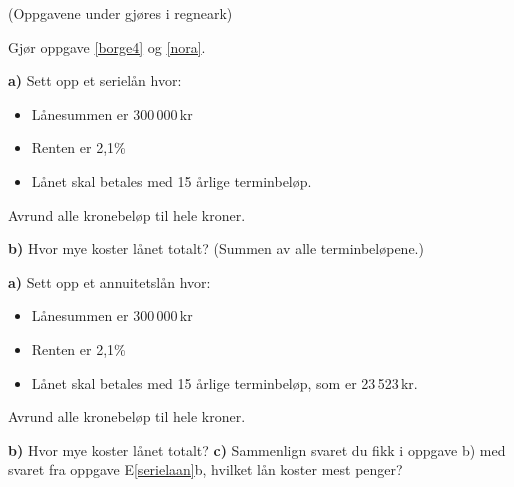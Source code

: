 



{} 

\opgt

(Oppgavene under gjøres i regneark) \vsk

Gjør oppgave \ref{borge4} og \ref{nora}.

\textbf{a)} Sett opp et serielån hvor:
\begin{itemize}
	\item Lånesummen er 300\,000\,kr
	\item Renten er 2,1\%
	\item Lånet skal betales med 15 årlige terminbeløp.
\end{itemize}
Avrund alle kronebeløp til hele kroner.\os

\textbf{b)} Hvor mye koster lånet totalt? (Summen av alle terminbeløpene.)

\textbf{a)} Sett opp et annuitetslån hvor:
\begin{itemize}
	\item Lånesummen er 300\,000\,kr
	\item Renten er 2,1\%
	\item Lånet skal betales med 15 årlige terminbeløp, som er 23\,523\,kr.
\end{itemize}
Avrund alle kronebeløp til hele kroner.\os

\textbf{b)} Hvor mye koster lånet totalt? \os
\textbf{c)} Sammenlign svaret du fikk i oppgave b) med svaret fra oppgave E\ref{serielaan}b, hvilket lån koster mest penger?\os

